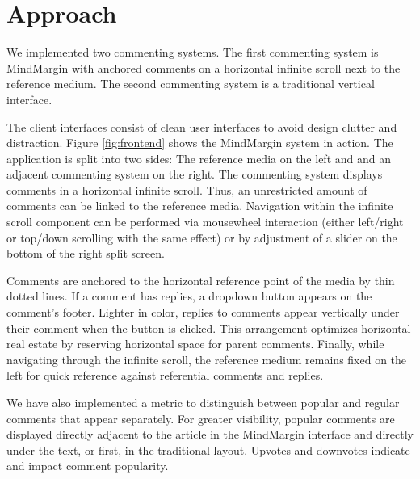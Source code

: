 \section {Approach}

We implemented two commenting systems. The first commenting system is MindMargin with anchored comments on a horizontal infinite scroll next to the reference medium. The second commenting system is a traditional vertical interface.

The client interfaces consist of clean user interfaces to avoid design clutter and distraction. Figure \ref{fig:frontend} shows the MindMargin system in action. The application is split into two sides: The reference media on the left and and an adjacent commenting system on the right. The commenting system displays comments in a horizontal infinite scroll. Thus, an unrestricted amount of comments can be linked to the reference media. Navigation within the infinite scroll component can be performed via mousewheel interaction (either left/right or top/down scrolling with the same effect) or by adjustment of a slider on the bottom of the right split screen. 

Comments are anchored to the horizontal reference point of the media by thin dotted lines. If a comment has replies, a dropdown button appears on the comment's footer. Lighter in color, replies to comments appear vertically under their comment when the button is clicked. This arrangement optimizes horizontal real estate by reserving horizontal space for parent comments. Finally, while navigating through the infinite scroll, the reference medium remains fixed on the left for quick reference against referential comments and replies.

We have also implemented a metric to distinguish between popular and regular comments that appear separately. For greater visibility, popular comments are displayed directly adjacent to the article in the MindMargin interface and directly under the text, or first, in the traditional layout. Upvotes and downvotes indicate and impact comment popularity. 
   
   

